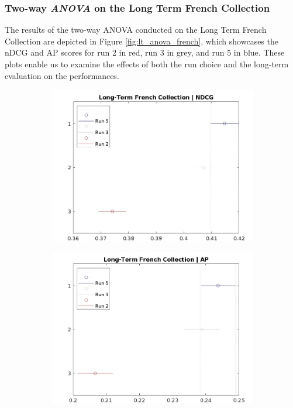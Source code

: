 \subsubsection{Two-way \textit{ANOVA} on the Long Term French Collection} \label{sec:anova_fr_lt}

The results of the two-way \ac{ANOVA} conducted on the Long Term French Collection are depicted in Figure \ref{fig:lt_anova_french}, which showcases the \ac{nDCG} and \ac{AP} scores for run 2 in red, run 3 in grey, and run 5 in blue. 
These plots enable us to examine the effects of both the run choice and the long-term evaluation on the performances.

\begin{figure}[!h]
    \centering
    \begin{subfigure}[b]{0.49\textwidth}
      \centering
      \includegraphics[width=\textwidth]{figure/StatisticalAnalysis/ANOVA 2/ndcg-lt-fr.jpeg}
      \label{fig:lt_anova_french_ndcg}
    \end{subfigure}
    \hfill
    \begin{subfigure}[b]{0.49\textwidth}
      \centering
      \includegraphics[width=\textwidth]{figure/StatisticalAnalysis/ANOVA 2/ap-lt-fr.jpeg}

\end{subfigure}
\end{figure}
